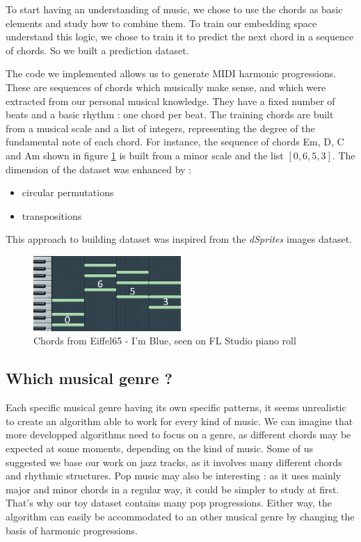 \documentclass{article}
\begin{document}
\hspace{0.5cm} To start having an understanding of music, we chose to use the chords as basic elements and study how to combine them. To train our embedding space understand this logic, we chose to train it to predict the next chord in a sequence of chords. So we built a prediction dataset.

\hspace{0.5cm}The code we implemented allows us to generate MIDI harmonic progressions. These are sequences of chords which musically make sense, and which were extracted from our personal musical knowledge. They have a fixed number of beats and a basic rhythm : one chord per beat. The training chords are built from a musical scale and a list of integers, representing the degree of the fundamental note of each chord. For instance, the sequence of chords Em, D, C and Am shown in figure \ref{eiffel} is built from a minor scale and the list $[0,6,5,3]$. The dimension of the dataset was enhanced by :
\begin{itemize}
\item circular permutations
\item transpositions
\end{itemize}

This approach to building dataset was inspired from the \textit{dSprites} images dataset.

\begin{figure}[H]
\centering
\includegraphics[width =0.5\textwidth]{eiffelmelo.png}
\caption{Chords from Eiffel65 - I'm Blue, seen on FL Studio piano roll}
\label{eiffel}
\end{figure}

\subsection{Which musical genre ?}
\hspace{0.5cm}Each specific musical genre having its own specific patterns, it seems unrealistic to create an algorithm able to work for every kind of music. We can imagine that more developped algorithms need to focus on a genre, as different chords may be expected at some moments, depending on the kind of music. Some of us suggested we base our work on jazz tracks, as it involves many different chords and rhythmic structures. Pop music may also be interesting : as it uses mainly major and minor chords in a regular way, it could be simpler to study at first. That's why our toy dataset contains many pop progressions. Either way, the algorithm can easily be accommodated to an other musical genre by changing the basis of harmonic progressions. 
\end{document}
